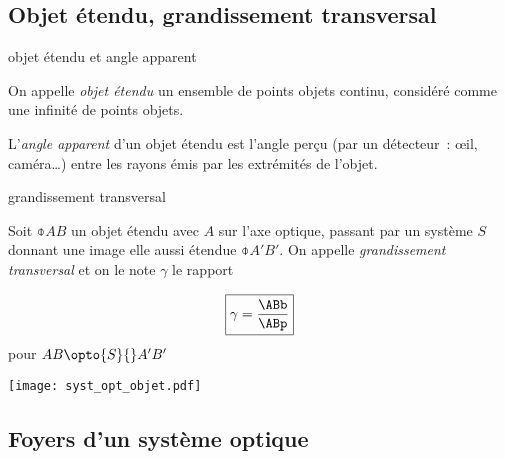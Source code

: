 \documentclass[../main/main.tex]{subfiles}
\begin{document}
\subsection{Objet étendu, grandissement transversal}
\begin{tcbraster}[raster columns=3, raster equal height=rows]
    \begin{defi}[label=def:objet]{objet étendu et angle apparent}
    
        On appelle \textit{objet étendu} un ensemble de points objets continu,
        considéré comme une infinité de points objets.\bigbreak

        L'\textit{angle apparent} d'un objet étendu est l'angle perçu (par un
        détecteur~: œil, caméra…) entre les rayons émis par les extrémités de
        l'objet.
    
    \end{defi}
    \begin{defi}[label=def:grand, raster multicolumn=2,
        sidebyside]{grandissement transversal}

        Soit $\obar{AB}$ un objet étendu avec $A$ sur l'axe optique, passant par
        un système $S$ donnant une image elle aussi étendue $\obar{A'B'}$. On
        appelle \textit{grandissement transversal} et on le note $\gamma$ le
        rapport

        \[\boxed{\gamma = \frac{\ABb}{\ABp}}\]
        pour $AB \opto{S}{} A'B' $
        \tcblower
        \begin{center}
            \texttt{[image: syst\_opt\_objet.pdf]}
            \label{fig:obj_et}
        \end{center}
    \end{defi}
\end{tcbraster}

\subsection{Foyers d'un système optique}
\end{document}
